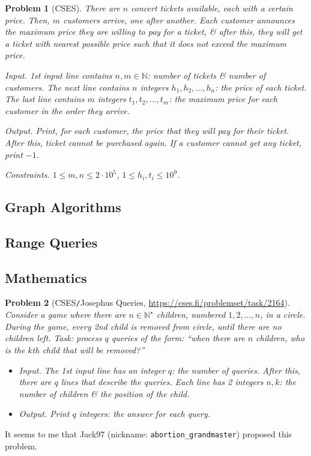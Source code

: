 \documentclass{article}
\newtheorem{problem}{Problem}
\begin{document}
\begin{problem}[CSES]
	There are $n$ concert tickets available, each with a certain price. Then, $m$ customers arrive, one after another. Each customer announces the maximum price they are willing to pay for a ticket, \& after this, they will get a ticket with nearest possible price such that it does not exceed the maximum price.
	\item {\sf Input.} 1st input line contains $n,m\in\mathbb{N}$: number of tickets \& number of customers. The next line contains $n$ integers $h_1,h_2,\ldots,h_n$: the price of each ticket. The last line contains $m$ integers $t_1,t_2,\ldots,t_m$: the maximum price for each customer in the order they arrive.
	\item {\sf Output.} Print, for each customer, the price that they will pay for their ticket. After this, ticket cannot be purchased again. If a customer cannot get any ticket, print $-1$.
	\item {\sf Constraints.} $1\le m,n\le 2\cdot10^5$, $1\le h_i,t_i\le10^9$.
\end{problem}

\subsection{Graph Algorithms}

\subsection{Range Queries}

\subsection{Mathematics}

\begin{problem}[CSES{\tt/}Josephus Queries, \url{https://cses.fi/problemset/task/2164}]
	Consider a game where there are $n\in\mathbb{N}^\star$ children, numbered $1,2,\ldots,n$, in a circle. During the game, every 2nd child is removed from circle, until there are no children left. Task: process $q$ queries of the form: ``when there are $n$ children, who is the $k$th child that will be removed?''
	\begin{itemize}
		\item {\sf Input.} The 1st input line has an integer $q$: the number of queries. After this, there are $q$ lines that describe the queries. Each line has 2 integers $n,k$: the number of children \& the position of the child.
		\item {\sf Output.} Print $q$ integers: the answer for each query.
	\end{itemize}
\end{problem}
It seems to me that {\sf Jack97} (nickname: \verb|abortion_grandmaster|) proposed this problem.
\end{document}
